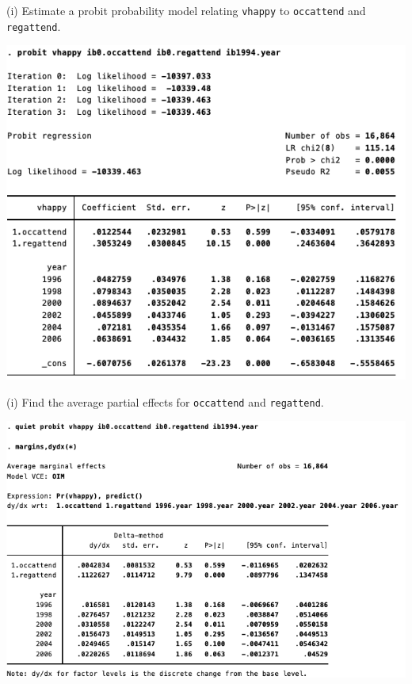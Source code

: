\documentclass[
  10pt,
  ignorenonframetext,
]{beamer}
\begin{document}
\begin{frame}{(i) Estimate a probit probability model relating
\texttt{vhappy} to \texttt{occattend} and \texttt{regattend}.}
\protect\hypertarget{i-estimate-a-probit-probability-model-relating-vhappy-to-occattend-and-regattend.}{}
\begin{center}\includegraphics[width=0.8\linewidth]{pictures/ex2-PROBIT} \end{center}
\end{frame}

\begin{frame}{(i) Find the average partial effects for
\texttt{occattend} and \texttt{regattend}.}
\protect\hypertarget{i-find-the-average-partial-effects-for-occattend-and-regattend.}{}
\begin{center}\includegraphics[width=0.9\linewidth]{pictures/ex2-PROBIT-APE} \end{center}
\end{frame}
\end{document}
